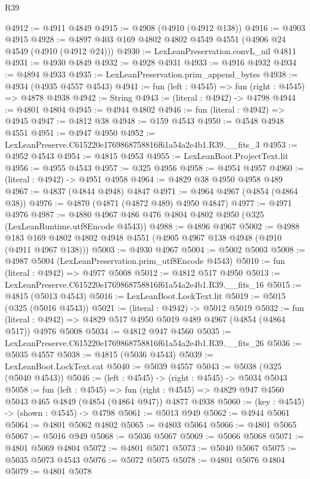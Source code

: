 \begin{lexlean}{R39}
\begin{coremodule}
@4912 := @4911 @4849
@4915 := @4908 (@4910 (@4912 @138))
@4916 := @4903 @4915
@4928 := @4897 @403 @169 @4802 @4802 @4549 @4551 (@4906 @24 @4549 (@4910 (@4912 @24)))
@4930 := LexLeanPreservation.convL_nil @4811
@4931 := @4930 @4849
@4932 := @4928 @4931
@4933 := @4916 @4932
@4934 := @4894 @4933
@4935 := LexLeanPreservation.prim_append_bytes
@4938 := @4934 (@4935 @4557 @4543)
@4941 := fun (left : @4545) => fun (right : @4545) => @4878 @4938
@4942 := String
@4943 := (literal : @4942) -> @4798
@4944 := @4801 @4804
@4945 := @4944 @4802
@4946 := fun (literal : @4942) => @4945
@4947 := @4812 @38
@4948 := @159 @4543
@4950 := @4548 @4948 @4551
@4951 := @4947 @4950
@4952 := LexLeanPreserve.C615220e1769868758816f61a54a2e4b1.R39.__fits_3
@4953 := @4952 @4543
@4954 := @4815 @4953
@4955 := LexLeanBoot.ProjectText.lit
@4956 := @4955 @4543
@4957 := @325 @4956
@4958 := @4954 @4957
@4960 := (literal : @4942) -> @4951 @4958
@4964 := @4829 @38 @4950 @4958 @489
@4967 := @4837 (@4844 @4948) @4847
@4971 := @4964 @4967 (@4854 (@4864 @38))
@4976 := @4870 (@4871 (@4872 @489) @4950 @4847)
@4977 := @4971 @4976
@4987 := @4880 @4967 @486 @476 @4804 @4802 @4950 (@325 (LexLeanRuntime.utf8Encode @4543))
@4988 := @4896 @4967
@5002 := @4988 @183 @169 @4802 @4802 @4948 @4551 (@4905 @4967 @138 @4948 (@4910 (@4911 @4967 @138)))
@5003 := @4930 @4967
@5004 := @5002 @5003
@5008 := @4987 @5004 (LexLeanPreservation.prim_utf8Encode @4543)
@5010 := fun (literal : @4942) => @4977 @5008
@5012 := @4812 @517 @4950
@5013 := LexLeanPreserve.C615220e1769868758816f61a54a2e4b1.R39.__fits_16
@5015 := @4815 (@5013 @4543)
@5016 := LexLeanBoot.LockText.lit
@5019 := @5015 (@325 (@5016 @4543))
@5021 := (literal : @4942) -> @5012 @5019
@5032 := fun (literal : @4942) => @4829 @517 @4950 @5019 @489 @4967 (@4854 (@4864 @517)) @4976 @5008
@5034 := @4812 @947 @4560
@5035 := LexLeanPreserve.C615220e1769868758816f61a54a2e4b1.R39.__fits_26
@5036 := @5035 @4557
@5038 := @4815 (@5036 @4543)
@5039 := LexLeanBoot.LockText.cat
@5040 := @5039 @4557
@5043 := @5038 (@325 (@5040 @4543))
@5046 := (left : @4545) -> (right : @4545) -> @5034 @5043
@5058 := fun (left : @4545) =>
  fun (right : @4545) => @4829 @947 @4560 @5043 @465 @4849 (@4854 (@4864 @947)) @4877 @4938
@5060 := (key : @4545) -> (shown : @4545) -> @4798
@5061 := @5013 @949
@5062 := @4944 @5061
@5064 := @4801 @5062 @4802
@5065 := @4803 @5064
@5066 := @4801 @5065
@5067 := @5016 @949
@5068 := @5036 @5067
@5069 := @5066 @5068
@5071 := @4801 @5069 @4804
@5072 := @4801 @5071
@5073 := @5040 @5067
@5075 := @5035 @5073 @4543
@5076 := @5072 @5075
@5078 := @4801 @5076 @4804
@5079 := @4801 @5078

\end{coremodule}
\end{lexlean}
